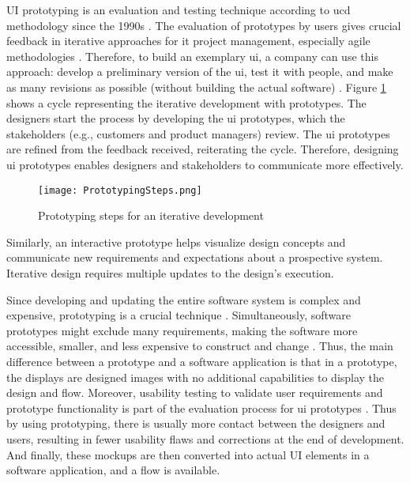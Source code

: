 UI prototyping is an evaluation and testing technique according to \ac{ucd} methodology since the 1990s \cite{article:prototyping:preece}.
The evaluation of prototypes by users gives crucial feedback in iterative approaches for \ac{it} project management, especially agile methodologies \cite{article:prototyping:schwaber}.
Therefore, to build an exemplary \ac{ui}, a company can use this approach: develop a preliminary version of the \ac{ui}, test it with people, and make as many revisions as possible (without building the actual software) \cite{article:prototyping:gould}.
Figure \ref{fig:background:stepsPrototyping} shows a cycle representing the iterative development with prototypes.
The designers start the process by developing the \ac{ui} prototypes, which the stakeholders (e.g., customers and product managers) review. 
The \ac{ui} prototypes are refined from the feedback received, reiterating the cycle.
Therefore, designing \ac{ui} prototypes enables designers and stakeholders to communicate more effectively.
\begin{figure}[htbp!]
  \centering    
  \texttt{[image: PrototypingSteps.png]}
  \caption[Steps of Prototyping]{Prototyping steps for an iterative development}
  \label{fig:background:stepsPrototyping}
\end{figure}
Similarly, an interactive prototype helps visualize design concepts and communicate new requirements and expectations about a prospective system.
Iterative design requires multiple updates to the design's execution.

Since developing and updating the entire software system is complex and expensive, prototyping is a crucial technique \cite{article:prototyping:szekely}.
Simultaneously, software prototypes might exclude many requirements, making the software more accessible, smaller, and less expensive to construct and change \cite{article:prototyping:szekely}. 
Thus, the main difference between a prototype and a software application is that in a prototype, the displays are designed images with no additional capabilities to display the design and flow. 
Moreover, usability testing to validate user requirements and prototype functionality is part of the evaluation process for \ac{ui} prototypes \cite{article:prototyping:hoffnagle}.
Thus by using prototyping, there is usually more contact between the designers and users, resulting in fewer usability flaws and corrections at the end of development.
And finally, these mockups are then converted into actual UI elements in a software application, and a flow is available.

